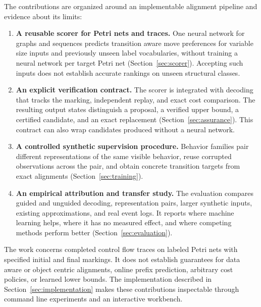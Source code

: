 The contributions are organized around an implementable alignment pipeline and evidence about its limits:
\begin{enumerate}[label=\textbf{C\arabic*.},leftmargin=*]
\item \begin{revised}\textbf{A reusable scorer for Petri nets and traces.} One neural network for graphs and sequences predicts transition aware move preferences for variable size inputs and previously unseen label vocabularies, without training a neural network per target Petri net (Section~\ref{sec:scorer}). Accepting such inputs does not establish accurate rankings on unseen structural classes.\end{revised}
\item \textbf{An explicit verification contract.} The scorer is integrated with decoding that tracks the marking, independent replay, and exact cost comparison. The resulting output states distinguish a proposal, a verified upper bound, a certified candidate, and an exact replacement (Section~\ref{sec:assurance}). This contract can also wrap candidates produced without a neural network.
\item \textbf{A controlled synthetic supervision procedure.} Behavior families pair different representations of the same visible behavior, reuse corrupted observations across the pair, and obtain concrete transition targets from exact alignments (Section~\ref{sec:training}).
\item \textbf{An empirical attribution and transfer study.} The evaluation compares guided and unguided decoding, representation pairs, larger synthetic inputs, existing approximations, and real event logs. It reports where machine learning helps, where it has no measured effect, and where competing methods perform better (Section~\ref{sec:evaluation}).
\end{enumerate}
The work concerns completed control flow traces on labeled Petri nets with specified initial and final markings. It does not establish guarantees for data aware or object centric alignments, online prefix prediction, arbitrary cost policies, or learned lower bounds. The implementation described in Section~\ref{sec:implementation} makes these contributions inspectable through command line experiments and an interactive workbench.
